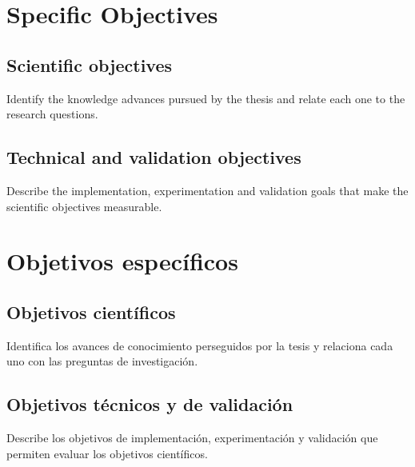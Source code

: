 {
  \section{Specific Objectives}
  \subsection{Scientific objectives}

  Identify the knowledge advances pursued by the thesis and relate each one to the research questions.

  \subsection{Technical and validation objectives}

  Describe the implementation, experimentation and validation goals that make the scientific objectives measurable.
}
{
  \section{Objetivos específicos}
  \subsection{Objetivos científicos}

  Identifica los avances de conocimiento perseguidos por la tesis y relaciona cada uno con las preguntas de investigación.

  \subsection{Objetivos técnicos y de validación}

  Describe los objetivos de implementación, experimentación y validación que permiten evaluar los objetivos científicos.
}








